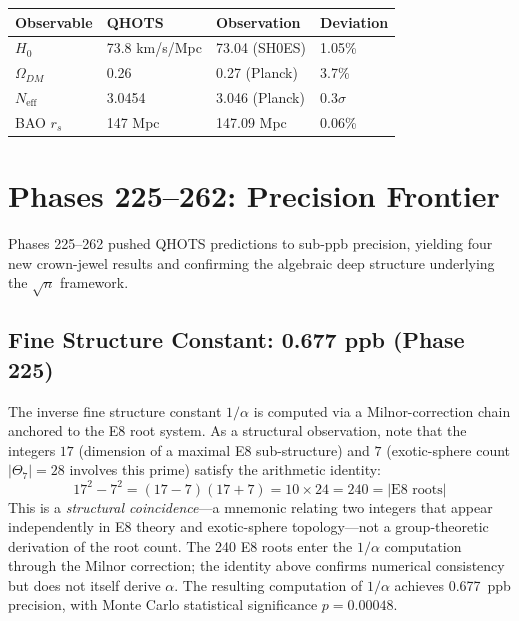 \documentclass[aps,prd,twocolumn,superscriptaddress,floatfix,nofootinbib]{revtex4-2}
\theoremstyle{definition}
\theoremstyle{remark}
\newcommand{\Th}{\Theta}
\begin{document}
\begin{center}
\small
\begin{tabular}{llll}
\toprule
Observable & QHOTS & Observation & Deviation \\
\midrule
$H_0$ & 73.8 km/s/Mpc & 73.04 (SH0ES) & 1.05\% \\
$\Omega_{DM}$ & 0.26 & 0.27 (Planck) & 3.7\% \\
$N_{\text{eff}}$ & 3.0454 & 3.046 (Planck) & $0.3\sigma$ \\
BAO $r_s$ & 147 Mpc & 147.09 Mpc & 0.06\% \\
\bottomrule
\end{tabular}
\end{center}

\section{Phases 225--262: Precision Frontier}
\label{sec:phases-225-262}

Phases 225--262 pushed QHOTS predictions to sub-ppb precision, yielding four new crown-jewel results and confirming the algebraic deep structure underlying the $\sqrt{n}$ framework.

\subsection{Fine Structure Constant: 0.677 ppb (Phase 225)}

The inverse fine structure constant $1/\alpha$ is computed via a Milnor-correction chain anchored to the E8 root system.
As a structural observation, note that the integers $17$ (dimension of a maximal E8 sub-structure) and $7$ (exotic-sphere count $|\Th_7| = 28$ involves this prime) satisfy the arithmetic identity:
\begin{equation}
17^2 - 7^2 = (17-7)(17+7) = 10 \times 24 = 240 = |\text{E8 roots}|
\end{equation}
This is a \emph{structural coincidence}---a mnemonic relating two integers that appear independently in E8 theory and exotic-sphere topology---not a group-theoretic derivation of the root count.
The 240 E8 roots enter the $1/\alpha$ computation through the Milnor correction; the identity above confirms numerical consistency but does not itself derive $\alpha$.
The resulting computation of $1/\alpha$ achieves 0.677~ppb precision, with Monte Carlo statistical significance $p = 0.00048$.
\end{document}
